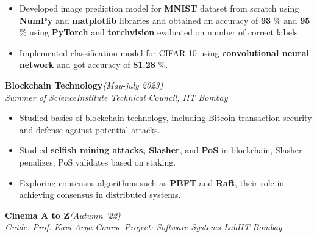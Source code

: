 \documentclass[10 pt]{article}
\begin{document}
		\begin{itemize}[itemsep = -0.8 mm, leftmargin=*]
		\vspace{-16pt}
		\item Developed image prediction model for \textbf{MNIST} dataset from scratch using \textbf{NumPy} and \textbf{matplotlib} libraries
  and obtained an accuracy of \textbf{93} \% and \textbf{95} \% using \textbf{PyTorch} and \textbf{torchvision} evaluated on number of correct labels.
		\item Implemented classification model for CIFAR-10 using \textbf{convolutional neural network} and got accuracy of \textbf{81.28} \%.
	\end{itemize}
 {\selectfont
		\textbf{{Blockchain Technology}}\hfill{\sl \small (May-july 2023)}\\
	}{\it Summer of Science}\hfill{\sl \small Institute Technical Council, IIT Bombay}\\

		\begin{itemize}[itemsep = -0.8 mm, leftmargin=*]
		\vspace{-16pt}
		\item  Studied basics of blockchain technology, including Bitcoin transaction security and defense against potential attacks.
  \item Studied \textbf{selfish mining attacks, Slasher}, and \textbf{PoS} in blockchain, Slasher penalizes, PoS validates based on staking.
  \item Exploring consensus algorithms such as \textbf{PBFT} and \textbf{Raft}, their role in achieving consensus in distributed systems.
	\end{itemize}
{\selectfont
		\textbf{{Cinema A to Z}}\hfill{\sl \small (Autumn '22)}\\
	}{\it Guide: Prof. Kavi Arya \textbar} {\it Course Project: Software Systems Lab}\hfill{\sl \small IIT Bombay}\\
\end{document}
